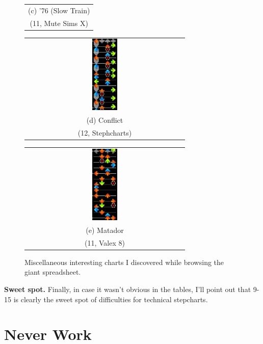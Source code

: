 \documentclass[10pt]{sigplanconf}
\begin{document}
\begin{figure}[t]
\begin{center}
\begin{tabular}{c}
		\\
		(c) '76 (Slow Train) \\
		(11, Mute Sims X)
	\end{tabular}
	\begin{tabular}{c}
		\includegraphics[width=0.16\textwidth]{conflict-cued-doublesteps.png}
		\\
		(d) Conflict \\
		(12, Stephcharts)
	\end{tabular}
	\begin{tabular}{c}
		\includegraphics[width=0.16\textwidth]{matador-bracket-switch.png}
		\\
		(e) Matador \\
		(11, Valex 8)
	\end{tabular}
	\end{center}
	\caption{Miscellaneous interesting charts I discovered while browsing the giant spreadsheet.}
	\label{fig:hble-mention}
\end{figure}

{\bf Sweet spot.}
Finally, in case it wasn't obvious in the tables, I'll point out that 9-15 is clearly the sweet spot of difficulties for technical stepcharts.

\section{Never Work}
\end{document}
